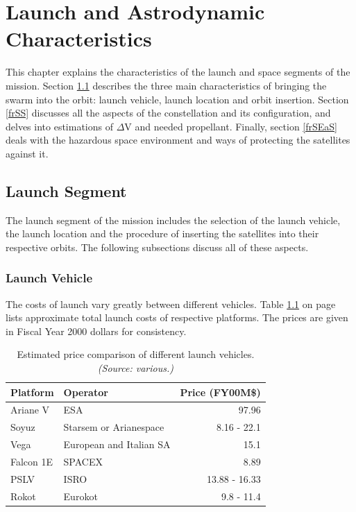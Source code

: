 \chapter{Launch and Astrodynamic Characteristics}
\label{frLaAC}
This chapter explains the characteristics of the launch and space segments of the mission. Section \ref{frLS} describes the three main characteristics of bringing the swarm into the orbit: launch vehicle, launch location and orbit insertion. Section \ref{frSS} discusses all the aspects of the constellation and its configuration, and delves into estimations of $\Delta$V and needed propellant. Finally, section \ref{frSEaS} deals with the hazardous space environment and ways of protecting the satellites against it. 

\section{Launch Segment}
\label{frLS}

The launch segment of the mission includes the selection of the launch vehicle, the launch location and the procedure of inserting the satellites into their respective orbits. The following subsections discuss all of these aspects. 

\subsection{Launch Vehicle}
\label{frLSLV}

The costs of launch vary greatly between different vehicles. Table \ref{table:vehicleCosts} on page \pageref{table:vehicleCosts} lists approximate total launch costs of respective platforms. The prices are given in Fiscal Year 2000 dollars for consistency.
\begin{table}[h]
\begin{centering}
\begin{tabular}{llr}
\toprule
Platform & Operator & Price (FY00M\$) \\
\hline \hline
Ariane V  & ESA & 97.96 \\
Soyuz   & Starsem or Arianespace&  8.16 - 22.1 \\
Vega   & European and Italian SA  & 15.1 \\
Falcon 1E  & SPACEX  & 8.89 \\
PSLV & ISRO & 13.88 - 16.33 \\
Rokot & Eurokot & 9.8 - 11.4 \\
\bottomrule
\end{tabular}
\caption{Estimated price comparison of different launch vehicles. \emph{(Source: various.)}}
\label{table:vehicleCosts}
\end{centering}
\end{table}

